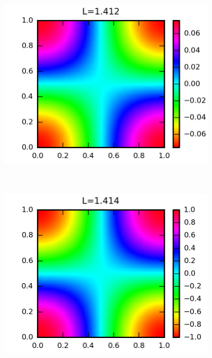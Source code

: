 \begin{figure}  
  \centering
  \begin{subfigure}{0.4\textwidth}
    \centering
    \includegraphics{figuras/modonum_3.png}
  \end{subfigure}
  ~
  \begin{subfigure}{0.4\textwidth}
    \centering
    \includegraphics{figuras/modoanalitico_1_1.png}
  \end{subfigure}
  

\end{figure}
